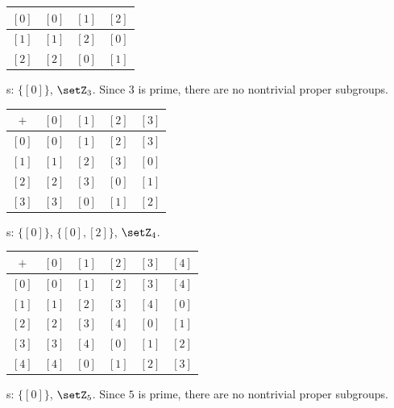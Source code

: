 \begin{enumerate}
\begin{subprove}
\begin{center}
\begin{tabular}{|c|c|c|c|}
    \hline
    \([0]\) & \([0]\) & \([1]\) & \([2]\) \\
    \hline
    \([1]\) & \([1]\) & \([2]\) & \([0]\) \\
    \hline
    \([2]\) & \([2]\) & \([0]\) & \([1]\) \\
    \hline
    \end{tabular}
    \end{center}
    s: \(\{[0]\}\), \(\setZ_{3}\). Since \(3\) is prime, 
    there are no nontrivial proper subgroups.\\
    \begin{center}
    \begin{tabular}{|c|c|c|c|c|}
    \hline
    \(+\) & \([0]\) & \([1]\) & \([2]\) & \([3]\) \\
    \hline
    \([0]\) & \([0]\) & \([1]\) & \([2]\) & \([3]\) \\
    \hline
    \([1]\) & \([1]\) & \([2]\) & \([3]\) & \([0]\) \\
    \hline
    \([2]\) & \([2]\) & \([3]\) & \([0]\) & \([1]\) \\
    \hline
    \([3]\) & \([3]\) & \([0]\) & \([1]\) & \([2]\) \\
    \hline
    \end{tabular}
    \end{center}
    s: \(\{[0]\}\), \(\{[0], [2]\}\), \(\setZ_{4}\).\\
    \begin{center}
    \begin{tabular}{|c|c|c|c|c|c|}
    \hline
    \(+\) & \([0]\) & \([1]\) & \([2]\) & \([3]\) & \([4]\) \\
    \hline
    \([0]\) & \([0]\) & \([1]\) & \([2]\) & \([3]\) & \([4]\) \\
    \hline
    \([1]\) & \([1]\) & \([2]\) & \([3]\) & \([4]\) & \([0]\) \\
    \hline
    \([2]\) & \([2]\) & \([3]\) & \([4]\) & \([0]\) & \([1]\) \\
    \hline
    \([3]\) & \([3]\) & \([4]\) & \([0]\) & \([1]\) & \([2]\) \\
    \hline
    \([4]\) & \([4]\) & \([0]\) & \([1]\) & \([2]\) & \([3]\) \\
    \hline
    \end{tabular}
    \end{center}
    s: \(\{[0]\}\), \(\setZ_{5}\). Since \(5\) is prime, 
    there are no nontrivial proper subgroups.\\

\end{subprove}
\end{enumerate}
